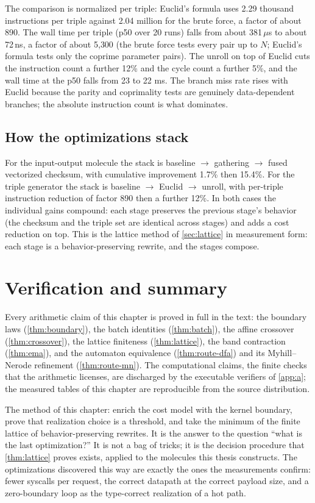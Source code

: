 The comparison is normalized per triple: Euclid's formula uses 2.29
thousand instructions per triple against 2.04 million for the brute
force, a factor of about 890. The wall time per triple (p50 over 20
runs) falls from about 381\,$\mu$s to about 72\,ns, a factor of about
5{,}300 (the brute force tests every pair up to $N$; Euclid's formula
tests only the coprime parameter pairs). The unroll on top of Euclid
cuts the instruction count a further 12\% and the cycle count a
further 5\%, and the wall time at the p50 falls from 23 to 22 ms. The
branch miss rate rises with Euclid because the parity and coprimality
tests are genuinely data-dependent branches; the absolute instruction
count is what dominates.

\subsection{How the optimizations stack}

For the input-output molecule the stack is
baseline $\to$ gathering $\to$ fused vectorized checksum, with
cumulative improvement 1.7\% then 15.4\%. For the triple generator the
stack is baseline $\to$ Euclid $\to$ unroll, with per-triple
instruction reduction of factor 890 then a further 12\%. In both cases
the individual gains compound: each stage preserves the previous
stage's behavior (the checksum and the triple set are identical across
stages) and adds a cost reduction on top. This is the lattice method
of \autoref{sec:lattice} in measurement form: each stage is a
behavior-preserving rewrite, and the stages compose.

\section{Verification and summary}\label{sec:breakthrough-verify}

Every arithmetic claim of this chapter is proved in full in the text:
the boundary laws (\autoref{thm:boundary}), the batch identities
(\autoref{thm:batch}), the affine crossover (\autoref{thm:crossover}),
the lattice finiteness (\autoref{thm:lattice}), the band contraction
(\autoref{thm:ema}), and the automaton equivalence
(\autoref{thm:route-dfa}) and its Myhill--Nerode refinement
(\autoref{thm:route-mn}). The computational claims, the finite
checks that the arithmetic licenses, are discharged by the executable
verifiers of \autoref{app:a}; the measured tables of this chapter are
reproducible from the source distribution.

The method of this chapter: enrich the cost model with the kernel
boundary, prove that realization choice is a threshold, and take the
minimum of the finite lattice of behavior-preserving rewrites. It is
the answer to the question ``what is the last optimization?'' It is
not a bag of tricks; it is the decision procedure that
\autoref{thm:lattice} proves exists, applied to the molecules this
thesis constructs. The optimizations discovered this way are exactly
the ones the measurements confirm: fewer syscalls per request, the
correct datapath at the correct payload size, and a zero-boundary loop
as the type-correct realization of a hot path.
